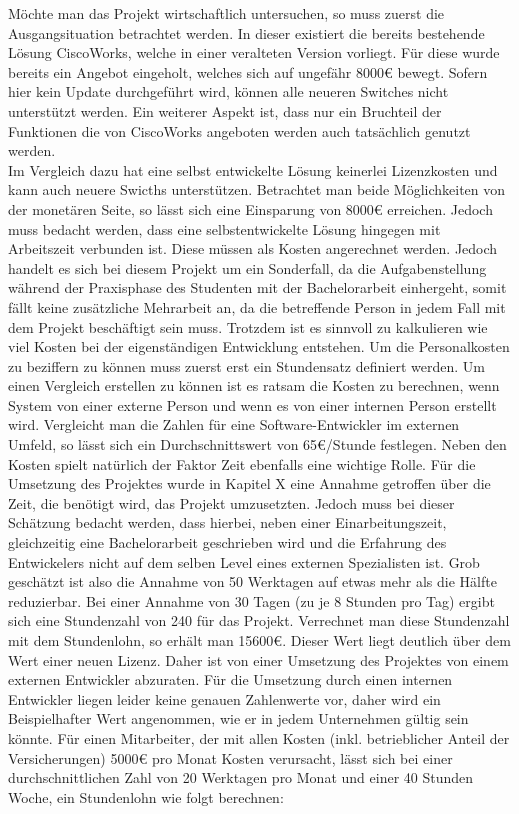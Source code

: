 Möchte man das Projekt wirtschaftlich untersuchen, so muss zuerst die Ausgangsituation betrachtet werden. In dieser existiert die bereits bestehende Lösung CiscoWorks, welche in einer veralteten Version vorliegt. Für diese wurde bereits ein Angebot eingeholt, welches sich auf ungefähr 8000€ bewegt. Sofern hier kein Update durchgeführt wird, können alle neueren Switches nicht unterstützt werden. Ein weiterer Aspekt ist, dass nur ein Bruchteil der Funktionen die von CiscoWorks angeboten werden auch tatsächlich genutzt werden.\\
Im Vergleich dazu hat eine selbst entwickelte Lösung keinerlei Lizenzkosten und kann auch neuere Swicths unterstützen. Betrachtet man beide Möglichkeiten von der monetären Seite, so lässt sich eine Einsparung von 8000€ erreichen. Jedoch muss bedacht werden, dass eine selbstentwickelte Lösung hingegen mit Arbeitszeit  verbunden ist.  Diese müssen als Kosten angerechnet werden. Jedoch handelt es sich bei diesem Projekt um ein Sonderfall, da die Aufgabenstellung während der Praxisphase des Studenten mit der Bachelorarbeit einhergeht, somit fällt keine zusätzliche Mehrarbeit an, da die betreffende Person in jedem Fall mit dem Projekt beschäftigt sein muss. Trotzdem ist es sinnvoll zu kalkulieren wie viel Kosten bei der eigenständigen Entwicklung entstehen.
Um die Personalkosten zu beziffern zu können muss zuerst erst ein Stundensatz definiert werden. Um einen Vergleich erstellen zu können ist es ratsam die Kosten zu berechnen, wenn System von einer externe Person und wenn es von einer internen Person erstellt wird.
Vergleicht man die Zahlen für eine Software-Entwickler im externen Umfeld, so lässt sich ein Durchschnittswert von 65€/Stunde festlegen. Neben den Kosten spielt natürlich der Faktor Zeit ebenfalls eine wichtige Rolle. Für die Umsetzung des Projektes wurde in Kapitel X eine Annahme getroffen über die Zeit, die benötigt wird, das Projekt umzusetzten. Jedoch muss bei dieser Schätzung bedacht werden, dass hierbei, neben einer Einarbeitungszeit, gleichzeitig eine Bachelorarbeit geschrieben wird und die Erfahrung des Entwickelers nicht auf dem selben Level eines externen Spezialisten ist. Grob geschätzt ist also die Annahme von 50 Werktagen auf etwas mehr als die Hälfte reduzierbar. Bei einer Annahme von 30 Tagen (zu je 8 Stunden pro Tag) ergibt sich eine Stundenzahl von 240 für das Projekt.
Verrechnet man diese Stundenzahl mit dem Stundenlohn, so erhält man 15600€. Dieser Wert liegt deutlich über dem Wert einer neuen Lizenz. Daher ist von einer Umsetzung des Projektes von einem externen Entwickler abzuraten. Für die Umsetzung durch einen internen Entwickler liegen leider keine genauen Zahlenwerte vor, daher wird ein Beispielhafter Wert angenommen, wie er in jedem Unternehmen gültig sein könnte. Für einen Mitarbeiter, der mit allen Kosten (inkl. betrieblicher Anteil der Versicherungen) 5000€ pro Monat Kosten verursacht, lässt sich bei einer durchschnittlichen Zahl von 20 Werktagen pro Monat und einer 40 Stunden Woche, ein Stundenlohn wie folgt berechnen:\\
